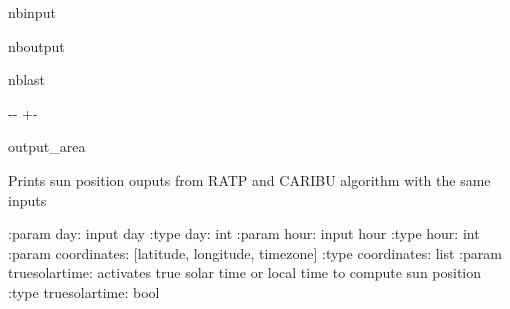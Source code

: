 \documentclass[letterpaper,10pt,english]{sphinxmanual}
\begin{document}
\begin{sphinxuseclass}{nbinput}
{
\begin{sphinxVerbatim}[commandchars=\\\{\}]
\llap{\color{nbsphinxin}[38]:\,\hspace{\fboxrule}\hspace{\fboxsep}}   

\end{sphinxVerbatim}
}

\end{sphinxuseclass}
\begin{sphinxuseclass}{nboutput}
\begin{sphinxuseclass}{nblast}
{

\kern-\sphinxverbatimsmallskipamount\kern-\baselineskip
\kern+\FrameHeightAdjust\kern-\fboxrule
\vspace{\nbsphinxcodecellspacing}

\begin{sphinxuseclass}{output_area}
\begin{sphinxuseclass}{}


\begin{sphinxVerbatim}[commandchars=\\\{\}]
Prints sun position ouputs from RATP and CARIBU algorithm with the same inputs

    :param day: input day
    :type day: int
    :param hour: input hour
    :type hour: int
    :param coordinates: [latitude, longitude, timezone]
    :type coordinates: list
    :param truesolartime: activates true solar time or local time to compute sun position
    :type truesolartime: bool

\end{sphinxVerbatim}



\end{sphinxuseclass}
\end{sphinxuseclass}
}

\end{sphinxuseclass}
\end{sphinxuseclass}
\end{document}
